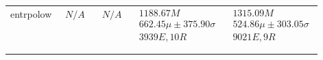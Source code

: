 \begin{tabular}{|l|p{6cm}|p{6cm}|p{6cm}|p{6cm}|}
entrpolow & $\begin{array}{c} N/A \end{array}$ & $\begin{array}{c} N/A \end{array}$ & $\begin{array}{c} 1188.67M \\ 662.45\mu \pm 375.90\sigma \\ 3939E, 10R \end{array}$ & $\begin{array}{c} 1315.09M \\ 524.86\mu \pm 303.05\sigma \\ 9021E, 9R \end{array}$ \\ \\ \hline
\bottomrule \\ \hline
\end{tabular}
